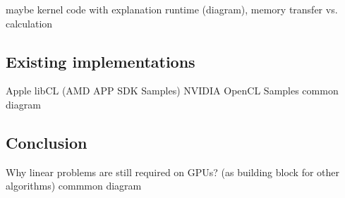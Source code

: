 maybe kernel code with explanation
runtime (diagram), memory transfer vs. calculation

\subsection{Existing implementations}
Apple
libCL
(AMD APP SDK Samples)
NVIDIA OpenCL Samples
common diagram

\subsection{Conclusion}
Why linear problems are still required on GPUs? (as building block for other algorithms)
commmon diagram
